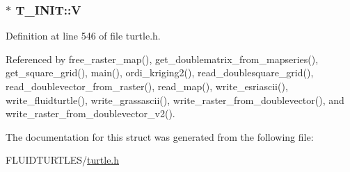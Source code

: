 \hypertarget{struct_t___i_n_i_t_a41a9ade275df71c2a10a03b75917244a}{
\subsubsection[{V}]{$\ast$ T\-\_\-\-I\-N\-I\-T\-::\-V}}\label{struct_t___i_n_i_t_a41a9ade275df71c2a10a03b75917244a}


Definition at line 546 of file turtle.\-h.



Referenced by free\-\_\-raster\-\_\-map(), get\-\_\-doublematrix\-\_\-from\-\_\-mapseries(), get\-\_\-square\-\_\-grid(), main(), ordi\-\_\-kriging2(), read\-\_\-doublesquare\-\_\-grid(), read\-\_\-doublevector\-\_\-from\-\_\-raster(), read\-\_\-map(), write\-\_\-esriascii(), write\-\_\-fluidturtle(), write\-\_\-grassascii(), write\-\_\-raster\-\_\-from\-\_\-doublevector(), and write\-\_\-raster\-\_\-from\-\_\-doublevector\-\_\-v2().



The documentation for this struct was generated from the following file\-:\begin{DoxyCompactItemize}
\item 
F\-L\-U\-I\-D\-T\-U\-R\-T\-L\-E\-S/\hyperlink{turtle_8h}{turtle.\-h}\end{DoxyCompactItemize}
